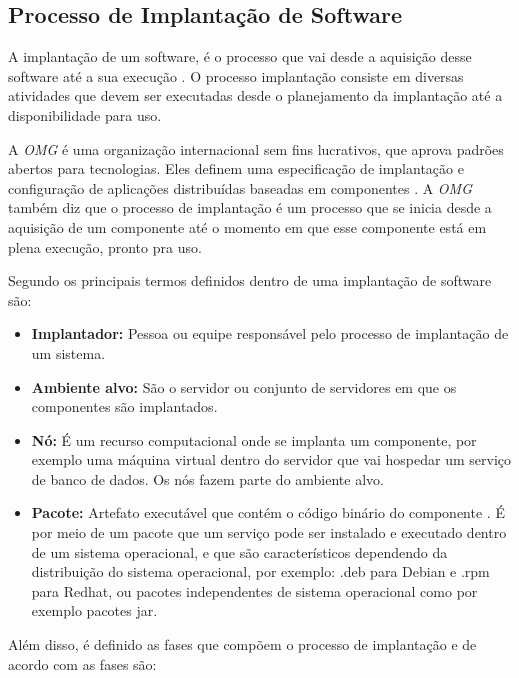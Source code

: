 \subsection{Processo de Implantação de Software}

A implantação de um software, é o processo que vai desde a aquisição desse software
até a sua execução \cite{leo2014}. O processo implantação consiste em diversas
atividades que devem ser executadas desde o planejamento da implantação até a
disponibilidade para uso.

A \textit{OMG} é uma organização internacional sem fins lucrativos,
que aprova padrões abertos para tecnologias. Eles definem uma especificação de
implantação e configuração de aplicações distribuídas baseadas em componentes \cite{omg2006}. 
A \textit{OMG} também diz que o processo de implantação é um processo que se inicia desde
a aquisição de um componente até o momento em que esse componente está em plena
execução, pronto pra uso.

Segundo  os principais termos definidos dentro de uma implantação
de software são:

\begin{itemize}
  \item  \textbf{Implantador:} Pessoa ou equipe responsável pelo processo de
  implantação  de um sistema.
  \item  \textbf{Ambiente alvo:} São o servidor ou conjunto de servidores em
  que os componentes são implantados.
  \item  \textbf{Nó:} É um recurso computacional onde se implanta um componente,
  por exemplo uma máquina virtual dentro do servidor que vai hospedar um serviço
  de banco de dados. Os nós fazem parte do ambiente alvo.
  \item  \textbf{Pacote:} Artefato executável que contém o código binário do componente
  . É por meio de um pacote que um serviço pode ser instalado e executado dentro
  de um sistema operacional, e que são característicos dependendo da distribuição
  do sistema operacional, por exemplo: .deb para Debian e .rpm para Redhat, ou
  pacotes independentes de sistema operacional como por exemplo pacotes jar.
\end{itemize}

Além disso, é definido as fases que compõem o processo de implantação e de acordo
com  as fases são:


